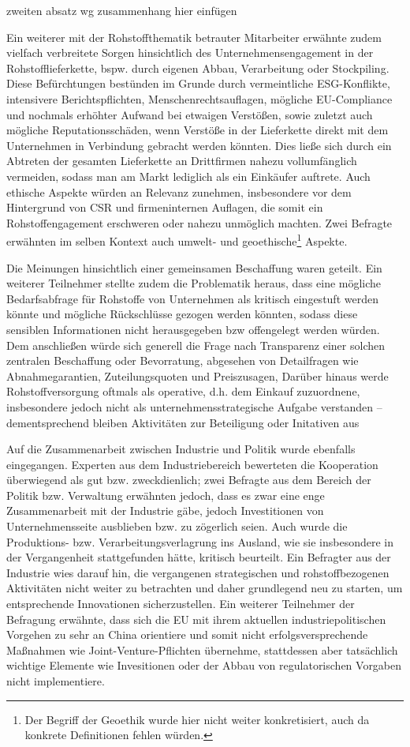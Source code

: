 \documentclass[12pt,a4paper,oneside]{book} %
\begin{document}
zweiten absatz wg zusammenhang hier einfügen

Ein weiterer mit der Rohstoffthematik betrauter Mitarbeiter erwähnte zudem vielfach verbreitete Sorgen hinsichtlich des Unternehmensengagement in der Rohstofflieferkette, bspw. durch eigenen Abbau, Verarbeitung oder Stockpiling. Diese Befürchtungen bestünden im Grunde durch vermeintliche ESG-Konflikte, intensivere Berichtspflichten, Menschenrechtsauflagen, mögliche EU-Compliance und nochmals erhöhter Aufwand bei etwaigen Verstößen, sowie zuletzt auch mögliche Reputationsschäden, wenn Verstöße in der Lieferkette direkt mit dem Unternehmen in Verbindung gebracht werden könnten. Dies ließe sich durch ein Abtreten der gesamten Lieferkette an Drittfirmen nahezu vollumfänglich vermeiden, sodass man am Markt lediglich als ein Einkäufer auftrete. Auch ethische Aspekte würden an Relevanz zunehmen, insbesondere vor dem Hintergrund von CSR und firmeninternen Auflagen, die somit ein Rohstoffengagement erschweren oder nahezu unmöglich machten. Zwei Befragte erwähnten im selben Kontext auch umwelt- und geoethische\footnote{Der Begriff der Geoethik wurde hier nicht weiter konkretisiert, auch da konkrete Definitionen fehlen würden.} Aspekte.

Die Meinungen hinsichtlich einer gemeinsamen Beschaffung waren geteilt.
Ein weiterer Teilnehmer stellte zudem die Problematik heraus, dass eine mögliche Bedarfsabfrage für Rohstoffe von Unternehmen als kritisch eingestuft werden könnte und mögliche Rückschlüsse gezogen werden könnten, sodass diese sensiblen Informationen nicht herausgegeben bzw offengelegt werden würden. Dem anschließen würde sich generell die Frage nach Transparenz einer solchen zentralen Beschaffung oder Bevorratung, abgesehen von Detailfragen wie Abnahmegarantien, Zuteilungsquoten und Preiszusagen,
Darüber hinaus werde Rohstoffversorgung oftmals als operative, d.h. dem Einkauf zuzuordnene, insbesondere jedoch nicht als unternehmensstrategische Aufgabe verstanden -- dementsprechend bleiben Aktivitäten zur Beteiligung oder Initativen aus

Auf die Zusammenarbeit zwischen Industrie und Politik wurde ebenfalls eingegangen. 
Experten aus dem Industriebereich bewerteten die Kooperation überwiegend als gut bzw. zweckdienlich; zwei Befragte aus dem Bereich der Politik bzw. Verwaltung erwähnten jedoch, dass es zwar eine enge Zusammenarbeit mit der Industrie gäbe, jedoch Investitionen von Unternehmensseite ausblieben bzw. zu zögerlich seien. Auch wurde die Produktions- bzw. Verarbeitungsverlagrung ins Ausland, wie sie insbesondere in der Vergangenheit stattgefunden hätte, kritisch beurteilt. 
Ein Befragter aus der Industrie wies darauf hin, die vergangenen strategischen und rohstoffbezogenen Aktivitäten nicht weiter zu betrachten und daher grundlegend neu zu starten, um entsprechende Innovationen sicherzustellen. Ein weiterer Teilnehmer der Befragung erwähnte, dass sich die EU mit ihrem aktuellen industriepolitischen Vorgehen zu sehr an China orientiere und somit nicht erfolgsversprechende Maßnahmen wie Joint-Venture-Pflichten übernehme, stattdessen aber tatsächlich wichtige Elemente wie Invesitionen oder der Abbau von regulatorischen Vorgaben nicht implementiere.
\end{document}
